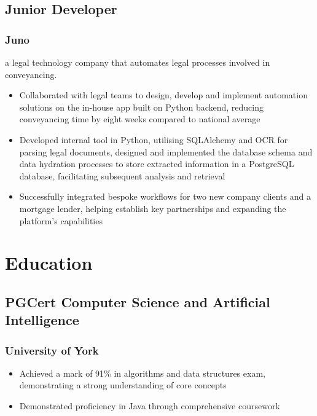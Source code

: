 \documentclass{article}
\begin{document}
\begin{paracol}{2}
  \subsection{Junior Developer}
  \subsubsection{Juno}
  {\color{LightGrey}\scriptsize\href{https://www.juno.legal}{\faExternalLink}}
  \hspace*{\fill}{\color{TitleGrey}{\scriptsize\faCalendar}\hspace{5pt}{\small10/2021 -- 12/2022}}
  
  {\noindent\small a legal technology company that automates legal processes involved in conveyancing.}
  \begin{itemize}[leftmargin=*]
    \setlength\itemsep{-2pt}
    \item Collaborated with legal teams to design, develop and implement automation solutions on the in-house app built on Python backend, reducing conveyancing time by eight weeks compared to national average
    \item Developed internal tool in Python, utilising SQLAlchemy and OCR for parsing legal documents, designed and implemented the database schema and data hydration processes to store extracted information in a PostgreSQL database, facilitating subsequent analysis and retrieval
    \item Successfully integrated bespoke workflows for two new company clients and a mortgage lender, helping establish key partnerships and expanding the platform's capabilities
  \end{itemize}

  \section{Education}
  \subsection{PGCert Computer Science and Artificial Intelligence}
  \subsubsection{University of York}
  \hspace*{\fill}{\small Awarded 2023}
  \begin{itemize}[leftmargin=*]
    \setlength\itemsep{-2pt}
    \item Achieved a mark of 91\% in algorithms and data structures exam, demonstrating a strong understanding of core concepts
    \item Demonstrated proficiency in Java through comprehensive coursework
  \end{itemize}


\end{paracol}
\end{document}
